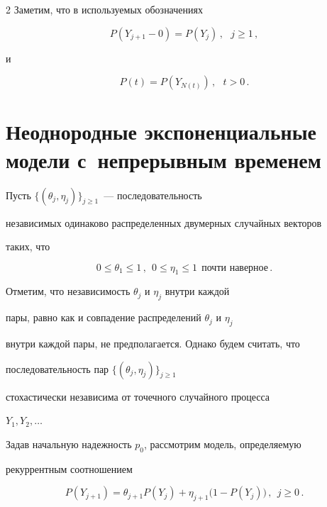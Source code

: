 \begin{multicols}{2}
Заметим, что в используемых обозначениях


$$


P(Y_{j+1}-0)=P(Y_j)\,,\ \ \ j\ge1\,,


$$


и


\begin{equation}


P(t)=P(Y_{N(t)})\,,\ \ \ t>0\,.


\label{e1art}


\end{equation}





\section{Неоднородные экспоненциальные модели с~непрерывным временем}





Пусть $\{(\theta_j,\eta_j)\}_{j\ge1}$~--- последовательность


независимых одинаково распределенных двумерных случайных векторов


таких, что


$$


0\le\theta_1\le 1\,,\ \ 0\le\eta_1\le 1\ \ {\mbox{почти \ наверное}}\,.


$$


Отметим, что независимость $\theta_j$ и $\eta_j$ внутри каждой


пары, равно как и совпадение распределений $\theta_j$ и $\eta_j$


внутри каждой пары, не предполагается. Однако будем считать, что


последовательность пар $\{(\theta_j,\eta_j)\}_{j\ge1}$


стохастически независима от точечного случайного процесса


$Y_1,Y_2,\ldots$





Задав начальную надежность $p_0$, рассмотрим модель, определяемую


рекуррентным соотноше\-нием


\begin{equation}


P(Y_{j+1})=\theta_{j+1}P(Y_j)+\eta_{j+1}\big(1-P(Y_j)\big)\,,\ \ j\ge0\,.


\label{e2art}



\end{equation}
\end{multicols}
